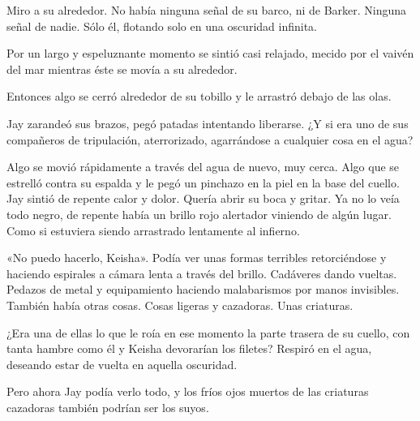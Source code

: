 {Miro a su alrededor. No había ninguna señal de su barco, ni de Barker.
 Ninguna señal de nadie. Sólo él, flotando solo en una oscuridad
infinita.}

{Por un largo y espeluznante momento se sintió casi relajado, mecido por
el vaivén del mar mientras éste se movía a su alrededor.}

{Entonces algo se cerró alrededor de su tobillo y le arrastró debajo de
las olas.}

{Jay zarandeó sus brazos, pegó patadas intentando liberarse. ¿Y si era
 uno de sus compañeros de tripulación, aterrorizado, agarrándose a
cualquier cosa en el agua?}

{Algo se movió rápidamente a través del agua de nuevo, muy cerca. Algo
 que se estrelló contra su espalda y le pegó un pinchazo en la piel en la
 base del cuello. Jay sintió de repente calor y dolor. Quería abrir su
 boca y gritar. Ya no lo veía todo negro, de repente había un brillo rojo
 alertador viniendo de algún lugar. Como si estuviera siendo arrastrado
lentamente al infierno.}

{«No puedo hacerlo, Keisha». Podía ver unas formas terribles
 retorciéndose y haciendo espirales a cámara lenta a través del brillo.
 Cadáveres dando vueltas. Pedazos de metal y equipamiento haciendo
 malabarismos por manos invisibles. También había otras cosas. Cosas
ligeras y cazadoras. Unas criaturas.}

{¿Era una de ellas lo que le roía en ese momento la parte trasera de su
 cuello, con tanta hambre como él y Keisha devorarían los filetes?
Respiró en el agua, deseando estar de vuelta en aquella oscuridad.}

{Pero ahora Jay podía verlo todo, y los fríos ojos muertos de las
criaturas cazadoras también podrían ser los suyos.}
